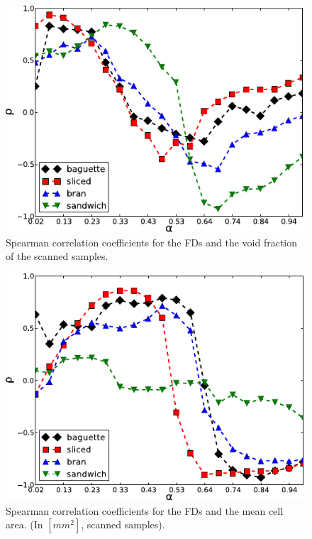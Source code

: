 \documentclass[spanish,a4paper,11pt,oneside,links]{report}
\begin{document}
\begin{figure}[h!]
\centering
\includegraphics{VF}
\caption{Spearman correlation coefficients for the FDs and the void fraction of the scanned samples.}
\label{fig:corrVF}
\end{figure}

\begin{figure}[h!]
\centering
\includegraphics{MCA}
\caption{Spearman correlation coefficients for the FDs and the mean cell area. (In $[mm^{2}]$, scanned samples).}
\label{fig:corrMCA}
\end{figure}
\end{document}
